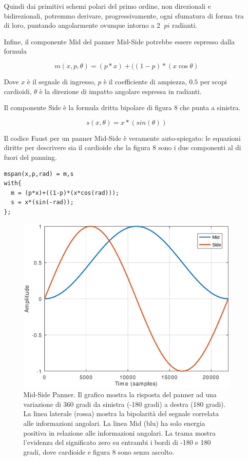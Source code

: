 Quindi dai primitivi schemi polari del primo ordine, non direzionali e
bidirezionali, potremmo derivare, progressivamente, ogni sfumatura di forma tra
di loro, puntando angolarmente ovunque intorno a 2 $ \ pi $ radianti.

Infine, il componente Mid del panner Mid-Side potrebbe essere espresso dalla
formula

\begin{equation}
m(x,p,\theta) = (p*x) + ((1-p)*(x\cos\theta)
\label{eq:mid}
\end{equation}

Dove $ x $ è il segnale di ingresso, $ p $ è il coefficiente di ampiezza, $0.5$
per scopi cardioidi, $\theta$ è la direzione di impatto angolare espressa in
radianti.

Il componente Side è la formula dritta bipolare di figura 8 che punta a sinistra.

\begin{equation}
s(x,\theta) = x*(sin(\theta))
\label{eq:side}
\end{equation}

Il codice Faust per un panner Mid-Side è veramente auto-spiegato: le equazioni
diritte per descrivere sia il cardioide che la figura 8 sono i due componenti
al di fuori del panning.

\begin{lstlisting}
mspan(x,p,rad) = m,s
with{
  m = (p*x)+((1-p)*(x*cos(rad)));
  s = x*(sin(-rad));
};
\end{lstlisting}

\begin{figure}[h]
\centering
\includegraphics[width=1\columnwidth]{CAPITOLI/1000/IMG/mspan}
\caption{Mid-Side Panner. Il grafico mostra la risposta del panner ad una
variazione di 360 gradi da sinistra (-180 gradi) a destra (180 gradi). La linea
laterale (rossa) mostra la
bipolarità del segnale correlata alle informazioni angolari. La linea Mid (blu)
ha solo energia positiva in relazione alle informazioni angolari. La trama
mostra l'evidenza del significato zero su entrambi i bordi di -180 e 180 gradi,
dove cardioide e figura 8 sono senza ascolto.}
\label{fig:mspan}
\end{figure}

